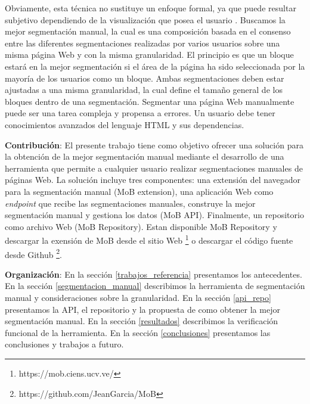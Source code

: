 \documentclass[10pt]{revecom}
\begin{document}
%
Obviamente, esta técnica no sustituye un enfoque formal, ya que puede resultar subjetivo dependiendo de la visualización que posea el usuario \cite{Cai:APWEB:2003}. 
%
Buscamos la mejor segmentación manual, la cual es una composición basada en el consenso entre las diferentes segmentaciones realizadas por varios usuarios sobre una misma página Web y con la misma granularidad.
%
El principio es que un bloque estará en la mejor segmentación si el área de la página ha sido seleccionada por la mayoría de los usuarios como un bloque.
%
Ambas segmentaciones deben estar ajustadas a una misma granularidad, la cual define el tamaño general de los bloques dentro de una segmentación.
%
Segmentar una página Web manualmente puede ser una tarea compleja y propensa a errores. 
%
Un usuario debe tener conocimientos avanzados del lenguaje HTML y sus dependencias.
%

\textbf{Contribución}: 
El presente trabajo tiene como objetivo ofrecer una solución para la obtención de la mejor segmentación manual mediante el desarrollo de una herramienta que permite a cualquier usuario realizar segmentaciones manuales de páginas Web.
La solución incluye tres componentes: una extensión del navegador para la segmentación manual (MoB extension), una aplicación Web como \textit{endpoint} que recibe las segmentaciones manuales, construye la mejor segmentación manual y gestiona los datos (MoB API). Finalmente, un repositorio como archivo Web (MoB Repository).
Estan disponible MoB Repository y descargar la exensión de MoB desde el sitio Web \footnote{https://mob.ciens.ucv.ve/} o descargar el código fuente desde Github \footnote{https://github.com/JeanGarcia/MoB}. 

\textbf{Organización}: 
En la sección \ref{trabajos_referencia} presentamos los antecedentes. 
En la sección \ref{segmentacion_manual} describimos la herramienta de segmentación manual y consideraciones sobre la granularidad. 
En la sección \ref{api_repo} presentamos la API, el repositorio y la propuesta de como obtener la mejor segmentación manual. 
En la sección \ref{resultados} describimos la verificación funcional de la herramienta. 
En la sección \ref{conclusiones} presentamos las conclusiones y trabajos a futuro.
\end{document}
